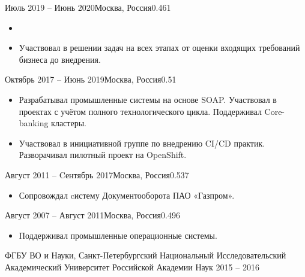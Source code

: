 \documentclass[10pt,a4paper,ragged2e]{maincv}
\begin{document}
\divider

{Июль 2019 -- Июнь 2020}{Москва, Россия}{0.461}
\begin{itemize} 
\item {}
\smallskip
\item
{Участвовал в решении задач на всех этапах от оценки входящих требований бизнеса до внедрения.}
\end{itemize}

\divider

{Октябрь 2017 -- Июнь 2019}{Москва, Россия}{0.51}
\begin{itemize}
\item {Разрабатывал промышленные системы на основе SOAP. Участвовал в проектах с учётом полного технологического цикла.
 Поддерживал Core-banking кластеры.}
\smallskip
\item {Участвовал в инициативной группе по внедрению CI/CD практик. Разворачивал пилотный проект на OpenShift.}
\end{itemize}

\divider

{Август 2011 -- Cентябрь 2017}{Москва, Россия}{0.537}
\begin{itemize}
\item Сопровождал cистему Документооборота ПАО «Газпром».
\end{itemize}

\divider

{Август 2007 -- Август 2011}{Москва, Россия}{0.496}
\begin{itemize}
\item Поддерживал промышленные операционные системы.
\end{itemize}

\clearpage


\begin{fullwidth}


{ФГБУ ВО и Науки, Санкт-Петербургский Национальный Исследовательский Академический \mbox{Университет} Российской Академии Наук}
{2015 -- 2016}{}

\end{fullwidth}
\end{document}
